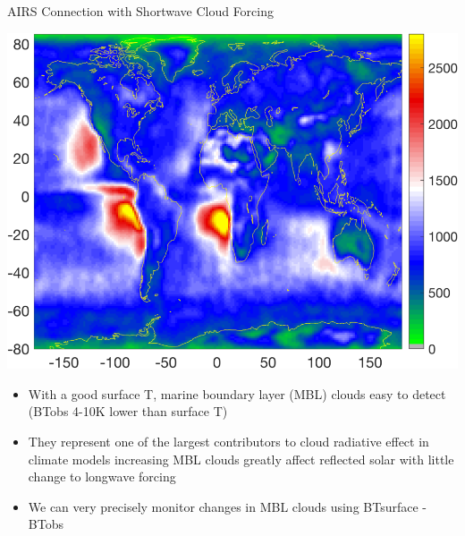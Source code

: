 \documentclass[10pt,t]{beamer}
\begin{document}
\begin{frame}[label={sec:org16736e3}]{AIRS Connection with Shortwave Cloud Forcing}
\vspace{-0.15in}
\begin{center}
  \includegraphics[width=0.65\linewidth]{./map_mbl_4K_to_10K_with_land.png}
\end{center}
\vspace{-0.15in}
\footnotesize
\begin{itemize}
\item With a good surface T, marine boundary layer (MBL) clouds easy to detect (BTobs 4-10K lower than surface T)
\item They represent one of the largest contributors to cloud radiative effect in climate models increasing MBL clouds greatly affect reflected solar with little change to longwave forcing
\item We can very precisely monitor changes in MBL clouds using BTsurface - BTobs
\end{itemize}
\end{frame}
\end{document}
